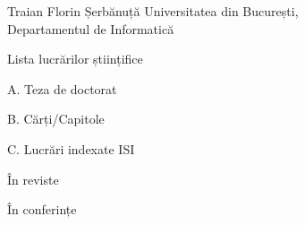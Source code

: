 \documentclass[12pt]{article}
\begin{document}



\renewcommand*{\cvbibname}{}

\begin{cv}{Traian Florin Șerbănuță}
\noindent Universitatea din București,\\ 
Departamentul de Informatică
  \begin{cvlist}{Lista lucrărilor științifice}
  \item[A. Teza de doctorat]
  \item[B. Cărți/Capitole]
  
  \item[C. Lucrări indexate ISI]

  \item[\hfill În reviste]
    
  \item[\hfill În conferințe]
    




%    
  \end{cvlist}
\end{cv}
\end{document}
